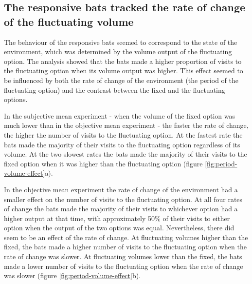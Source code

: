 \documentclass[
]{article}
\begin{document}
\hypertarget{the-responsive-bats-tracked-the-rate-of-change-of-the-fluctuating-volume}{%
\subsection{The responsive bats tracked the rate of change of the fluctuating volume}\label{the-responsive-bats-tracked-the-rate-of-change-of-the-fluctuating-volume}}

The behaviour of the responsive bats seemed to correspond to the state of the environment, which was determined by the volume output of the fluctuating option. The analysis showed that the bats made a higher proportion of visits to the fluctuating option when its volume output was higher. This effect seemed to be influenced by both the rate of change of the environment (the period of the fluctuating option) and the contrast between the fixed and the fluctuating options.

In the subjective mean experiment - when the volume of the fixed option was much lower than in the objective mean experiment - the faster the rate of change, the higher the number of visits to the fluctuating option. At the fastest rate the bats made the majority of their visits to the fluctuating option regardless of its volume. At the two slowest rates the bats made the majority of their visits to the fixed option when it was higher than the fluctuating option (figure \ref{fig:period-volume-effect}a).

In the objective mean experiment the rate of change of the environment had a smaller effect on the number of visits to the fluctuating option. At all four rates of change the bats made the majority of their visits to whichever option had a higher output at that time, with approximately 50\% of their visits to either option when the output of the two options was equal. Nevertheless, there did seem to be an effect of the rate of change. At fluctuating volumes higher than the fixed, the bats made a higher number of visits to the fluctuating option when the rate of change was slower. At fluctuating volumes lower than the fixed, the bats made a lower number of visits to the fluctuating option when the rate of change was slower (figure \ref{fig:period-volume-effect}b).
\end{document}
